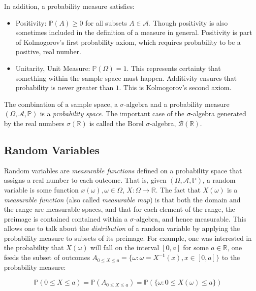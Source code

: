 In addition, a probability measure satisfies:

\begin{itemize}
\item Positivity: $\mathbb{P}(A) \geq 0$ for all subsets $A\in\mathscr{A}$. Though positivity is also sometimes included in the definition of a measure in general. Positivity is part of Kolmogorov's first probability axiom, which requires probability to be a positive, real number.
\item Unitarity, Unit Measure: $\mathbb{P}(\Omega) = 1$. This represents certainty that something within the sample space must happen. Additivity ensures that probability is never greater than $1$. This is Kolmogorov's second axiom. 
\end{itemize}

The combination of a sample space, a $\sigma$-algebra and a probability measure $(\Omega,\mathscr{A},\mathbb{P})$ is a \textit{probability space}. The important case of the $\sigma$-algebra generated by the real numbers $\sigma(\mathbb{R})$ is called the Borel $\sigma$-algebra, $\mathscr{B}(\mathbb{R})$. 


\subsection{Random Variables}
Random variables are \textit{measurable functions} defined on a probability space that assigns a real number to each outcome. That is, given $(\Omega,\mathscr{A},\mathbb{P})$, a random variable is some function $x(\omega), \omega \in \Omega$, $X:\Omega \rightarrow \mathbb{R}$. The fact that $X(\omega)$ is a \textit{measurable function} (also called \textit{measurable map}) is that both the domain and the range are measurable spaces, and that for each element of the range, the preimage is contained contained within a $\sigma$-algebra, and hence measurable. This allows one to talk about the \textit{distribution} of a random variable by applying the probability measure to subsets of its preimage. For example, one was interested in the probability that $X(\omega)$ will fall on the interval $[0,a]$ for some $a\in \mathbb{R}$, one feeds the subset of outcomes $A_{0\leq X\leq a} = \{\omega : \omega=X^{-1}(x), x \in [0,a]\}$ to the probability measure:

\begin{equation}
\mathbb{P}(0\leq X \leq a) = \mathbb{P}(A_{0\leq X\leq a}) = \mathbb{P}(\{\omega : 0\leq X(\omega) \leq a\})
\end{equation} 



